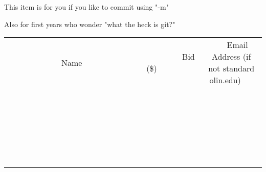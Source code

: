 \documentclass[11pt]{article}
\begin{document}
This item is for you if you like to commit using "-m"

Also for first years who wonder "what the heck is git?"
\\[6ex]
\begin{tabular}{c c c}
~~~~~~~~~~~~~Name~~~~~~~~~~~~~ & ~~~~~~~~~Bid (\$)~~~~~~~~~  & ~~~Email Address (if not standard olin.edu)~~~\\
 & & \\
\hline
 & & \\
\hline
 & & \\
\hline
 & & \\
\hline
 & & \\
\hline
 & & \\
\hline
 & & \\
\hline
 & & \\
\hline
 & & \\
\hline
 & & \\
\hline
 & & \\
\hline
 & & \\
\hline
 & & \\
\hline
 & & \\
\hline
 & & \\
\hline
 & & \\
\hline
 & & \\
\hline
 & & \\
\hline
 & & \\
\hline
 & & \\
\hline
 & & \\
\hline
 & & \\
\hline
 & & \\
\hline
 & & \\
\hline
 & & \\
\hline
 & & \\
\hline
\end{tabular}
\newpage
\end{document}
